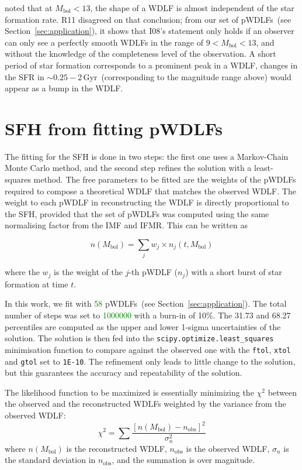 \documentclass[fleqn,usenatbib]{mnras}
\begin{document}
\citet[][hereafter, I08]{2008ApJ...682L.109I} noted that at
$M_{\mathrm{bol}} < 13$, the shape of a WDLF is almost independent of the star
formation rate. R11 disagreed on that conclusion; from our set of pWDLFs~(see
Section~\ref{sec:application}), it shows that I08's statement only holds
if an observer can only see a perfectly smooth WDLFs in the range of 
$9 < M_{\mathrm{bol}} < 13$, and without the knowledge of the completeness level
of the observation. A short period of star formation corresponds to a
prominent peak in a WDLF, changes in the SFR in $\sim$$0.25-2$\,Gyr~(corresponding
to the magnitude range above) would appear as a bump in the WDLF.

\section{SFH from fitting pWDLFs}
\label{sec:fitting}
The fitting for the SFH is done in two steps: the first one uses a Markov-Chain
Monte Carlo method, and the second step refines the solution with a least-squares
method. The free parameters to be fitted are the weights of the pWDLFs required 
to compose a theoretical WDLF that matches the observed WDLF. The weight to
each pWDLF in reconstructing the WDLF is directly proportional to the SFH,
provided that the set of pWDLFs was computed using the same normalising factor
from the IMF and IFMR. This can be written as

\begin{equation}
    n(M_\mathrm{bol}) = \sum_j w_j \times n_j(t, M_\mathrm{bol})    
\end{equation}

where the $w_j$ is the weight of the $j$-th pWDLF ($n_j$) with a short burst of
star formation at time $t$.

In this work, we fit with \textcolor{green}{58} pWDLFs~(see Section~\ref{sec:application}). 
The total number of steps was set to \textcolor{green}{1000000} with a burn-in of
10\%. The 31.73 and 68.27 percentiles are computed as the upper and lower 1-sigma 
uncertainties of the solution. The solution is then fed into the 
\texttt{scipy.optimize.least\_squares} minimisation function to compare against
the observed one with the \texttt{ftol}, \texttt{xtol} and \texttt{gtol} set to
\texttt{1E-10}. The refinement only leads to little change to the solution, but
this guarantees the accuracy and repeatability of the solution.

The likelihood function to be maximized is essentially minimizing the $\chi^2$
between the observed and the reconstructed WDLFs weighted by the variance from
the observed WDLF:
\begin{equation}
    \chi^2 = \sum \frac{\left[n(M_\mathrm{bol}) - n_\mathrm{obs}\right]^2}{\sigma_n^2}
\end{equation}
where $n(M_\mathrm{bol})$ is the reconstructed WDLF, $n_\mathrm{obs}$ is the
observed WDLF, $\sigma_n$ is the standard deviation in $n_\mathrm{obs}$, and the
summation is over magnitude.
\end{document}
